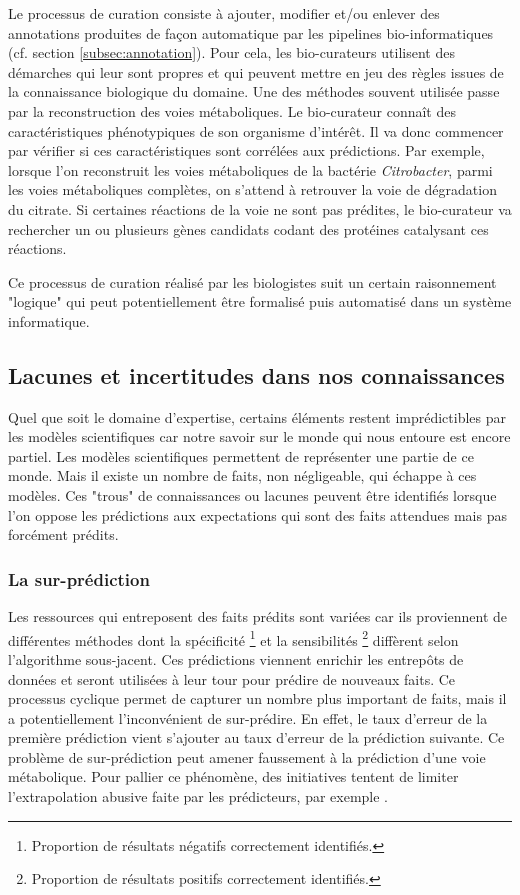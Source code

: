 \begin{refsegment}
    Le processus de curation consiste à ajouter, modifier et/ou enlever des annotations produites de façon automatique par les pipelines bio-informatiques (cf. section \cref{subsec:annotation}). Pour cela, les bio-curateurs utilisent des démarches qui leur sont propres et qui peuvent mettre en jeu des règles issues de la connaissance biologique du domaine. Une des méthodes souvent utilisée passe par la reconstruction des voies métaboliques. Le bio-curateur connaît des caractéristiques phénotypiques de son organisme d'intérêt. Il va donc commencer par vérifier si ces caractéristiques sont corrélées aux prédictions. Par exemple, lorsque l'on reconstruit les voies métaboliques de la bactérie \textit{Citrobacter}, parmi les voies métaboliques complètes, on s'attend à retrouver la voie de dégradation du citrate. Si certaines réactions de la voie ne sont pas prédites, le bio-curateur va rechercher un ou plusieurs gènes candidats codant des protéines catalysant ces réactions.
    
    Ce processus de curation réalisé par les biologistes suit un certain raisonnement "logique" qui peut potentiellement être formalisé puis automatisé dans un système informatique.
    
    \subsection{Lacunes et incertitudes dans nos connaissances}\label{subsec:lacunes}
    
    Quel que soit le domaine d'expertise, certains éléments restent imprédictibles par les modèles scientifiques car notre savoir sur le monde qui nous entoure est encore partiel. Les modèles scientifiques permettent de représenter une partie de ce monde. Mais il existe un nombre de faits, non négligeable, qui échappe à ces  modèles. Ces "trous" de connaissances ou lacunes peuvent être identifiés lorsque l'on oppose les prédictions aux expectations qui sont des faits attendues mais pas forcément prédits.
    
    \subsubsection{La sur-prédiction}
    
    Les ressources qui entreposent des faits prédits sont variées car ils proviennent de différentes méthodes dont la spécificité \footnote{Proportion de résultats négatifs correctement identifiés.} et la sensibilités \footnote{Proportion de résultats positifs correctement identifiés.} diffèrent selon l'algorithme sous-jacent. Ces prédictions viennent enrichir les entrepôts de données et seront utilisées à leur tour pour prédire de nouveaux faits. Ce processus cyclique permet de capturer un nombre plus important de faits, mais il a potentiellement l'inconvénient de sur-prédire. En effet, le taux d'erreur de la première prédiction vient s'ajouter au taux d'erreur de la prédiction suivante. Ce problème de sur-prédiction peut amener faussement à la prédiction d'une voie métabolique. Pour pallier ce phénomène, des initiatives tentent de limiter l'extrapolation abusive faite par les prédicteurs, par exemple \citeauthor{pfeiffer2015manual}.
    

\end{refsegment}
